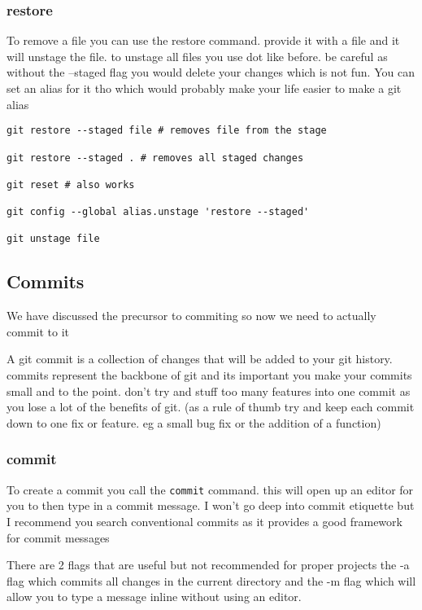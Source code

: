 \documentclass[a4paper]{article}
\begin{document}
\subsubsection*{restore}
\label{sec:orgc1bb853}
\begin{notes}
	To remove a file you can use the restore command. provide it with a file and it
	will unstage the file. to unstage all files you use dot like before. be careful
	as without the --staged flag you would delete your changes which is not fun. You
	can set an alias for it tho which would probably make your life easier to make a
	git alias
\end{notes}

\begin{verbatim}
git restore --staged file # removes file from the stage

git restore --staged . # removes all staged changes

git reset # also works

git config --global alias.unstage 'restore --staged'

git unstage file
\end{verbatim}

\subsection*{Commits}
\label{sec:org2b90356}
\begin{notes}
	We have discussed the precursor to commiting so now we need to actually commit
	to it

	A git commit is a collection of changes that will be added to your git history.
	commits represent the backbone of git and its important you make your commits
	small and to the point. don't try and stuff too many features into one commit as
	you lose a lot of the benefits of git. (as a rule of thumb try and keep each
	commit down to one fix or feature. eg a small bug fix or the addition of a
	function)
\end{notes}
\subsubsection*{commit}
\label{sec:orgea6b3ef}
\begin{notes}
	To create a commit you call the \texttt{commit} command. this will open up an editor for
	you to then type in a commit message. I won't go deep into commit etiquette but I
	recommend you search conventional commits as it provides a good framework for
	commit messages

	There are 2 flags that are useful but not recommended for proper projects
	the -a flag which commits all changes in the current directory
	and the -m flag which will allow you to type a message inline without using an
	editor.
\end{notes}
\end{document}

